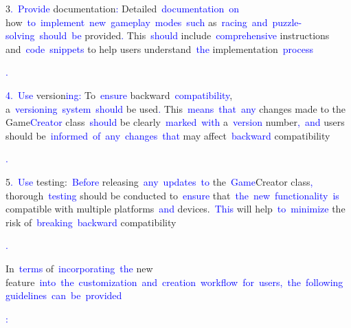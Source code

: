 \documentclass{article}
\begin{document}
\begin{tcolorbox}[colframe=black,colback=white]
{}3\textcolor{blue}{.}\textcolor{blue}{~Provide} documentation\textcolor{blue}{:} Detailed\textcolor{blue}{~documentation}\textcolor{blue}{~on} how\textcolor{blue}{~to}\textcolor{blue}{~implement}\textcolor{blue}{~new}\textcolor{blue}{~gameplay}\textcolor{blue}{~modes}\textcolor{blue}{~such} as\textcolor{blue}{~racing}\textcolor{blue}{~and}\textcolor{blue}{~puzzle}\textcolor{blue}{-solving}\textcolor{blue}{~should}\textcolor{blue}{~be} provided\textcolor{blue}{.} This\textcolor{blue}{~should} include\textcolor{blue}{~comprehensive} instructions and\textcolor{blue}{~code}\textcolor{blue}{~snippets} to help users understand\textcolor{blue}{~the} implementation\textcolor{blue}{~process}\textcolor{blue}{.

}\textcolor{blue}{4}\textcolor{blue}{.}\textcolor{blue}{~Use} version\textcolor{blue}{ing}\textcolor{blue}{:} To\textcolor{blue}{~ensure} backward\textcolor{blue}{~compatibility}, a\textcolor{blue}{~version}\textcolor{blue}{ing}\textcolor{blue}{~system}\textcolor{blue}{~should} be used\textcolor{blue}{.} This\textcolor{blue}{~means}\textcolor{blue}{~that}\textcolor{blue}{~any} changes made to the Game\textcolor{blue}{Creator} class\textcolor{blue}{~should} be clearly\textcolor{blue}{~marked}\textcolor{blue}{~with} a\textcolor{blue}{~version} number\textcolor{blue}{,}\textcolor{blue}{~and} users should be\textcolor{blue}{~informed}\textcolor{blue}{~of}\textcolor{blue}{~any}\textcolor{blue}{~changes}\textcolor{blue}{~that} may affect\textcolor{blue}{~backward} compatibility\textcolor{blue}{.

}5\textcolor{blue}{.}\textcolor{blue}{~Use} testing:\textcolor{blue}{~Before} releasing\textcolor{blue}{~any}\textcolor{blue}{~updates}\textcolor{blue}{~to} the\textcolor{blue}{~Game}Creator class\textcolor{blue}{,} thorough\textcolor{blue}{~testing} should be conducted to\textcolor{blue}{~ensure} that\textcolor{blue}{~the}\textcolor{blue}{~new}\textcolor{blue}{~functionality}\textcolor{blue}{~is} compatible with multiple platforms\textcolor{blue}{~and} devices.\textcolor{blue}{~This} will help\textcolor{blue}{~to}\textcolor{blue}{~minimize} the risk of\textcolor{blue}{~breaking}\textcolor{blue}{~backward} compatibility\textcolor{blue}{.

}In\textcolor{blue}{~terms} of\textcolor{blue}{~incorporating}\textcolor{blue}{~the} new feature\textcolor{blue}{~into}\textcolor{blue}{~the}\textcolor{blue}{~customization}\textcolor{blue}{~and}\textcolor{blue}{~creation}\textcolor{blue}{~workflow}\textcolor{blue}{~for}\textcolor{blue}{~users}\textcolor{blue}{,}\textcolor{blue}{~the}\textcolor{blue}{~following}\textcolor{blue}{~guidelines}\textcolor{blue}{~can}\textcolor{blue}{~be}\textcolor{blue}{~provided}\textcolor{blue}{:

}
\end{tcolorbox}
\end{document}
